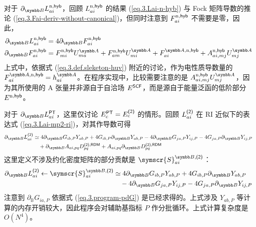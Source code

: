 对于 $\partial_\mathbb{B} L_{ai}^{\mathrm{n}, \textmt{hyb}}$，回顾 $L_{ai}^{\mathrm{n}, \textsf{hyb}}$ 的结果 (\ref{eq.3.Lai-n-hyb}) 与 Fock 矩阵导数的推论 (\ref{eq.3.Fai-deriv-without-canonical})，但同时注意到 $F_{ai}^{\mathrm{n}, \textsf{hyb}}$ 不需要是零，因此，
\begin{align}
    \partial_\mathbb{B} L_{ai}^{\mathrm{n}, \textmt{hyb}} &= 4 \partial_\mathbb{B} F_{ai}^{\mathrm{n}, \textmt{hyb}} \\
    \partial_\mathbb{B} F_{ai}^{\mathrm{n}, \textmt{hyb}} &= F_{mi}^{\mathrm{n}, \textmt{hyb}} U_{ma}^\mathbb{A} + F_{am}^{\mathrm{n}, \textmt{hyb}} U_{mi}^\mathbb{A} + F_{ai}^{\mathbb{A}, \mathrm{n}, \textmt{hyb}} + A_{ai, mj}^{\mathrm{n}, \textmt{hyb}} U_{mj}^\mathbb{A}
\end{align}
上式中，依据式 (\ref{eq.3.def.sleketon-huv}) 附近的讨论，作为电性质导数量的 $F_{ai}^{\mathbb{A}, \mathrm{n}, \textmt{hyb}} = h_{ai}^\mathbb{A}$。在程序实现中，比较需要注意的是 $A_{ai, mj}^{\mathrm{n}, \textmt{hyb}} U_{mj}^\mathbb{A}$，因为其所使用的 A 张量并非源自于自洽场 $E^{\textsf{SCF}}$，而是源自于能量泛函的低阶部分 $E^{\mathrm{n}, \textsf{hyb}}$。

对于 $\partial_\mathbb{B} L_{ai}^\textmt{PT}$，这里仅讨论 $E_\mathrm{c}^{\textsf{PT}} = E_\mathrm{c}^{\textsf{(2)}}$ 的情形。回顾 $L_{ai}^{\textsf{(2)}}$ 在 RI 近似下的表达式 (\ref{eq.3.Lai-mp2-ri})，对其作导数可得
\begin{align}
    \partial_\mathbb{B} L_{ai}^\textmt{(2)} &\simeq 4 \partial_\mathbb{B} G_{ib, P} Y_{ab, P} + 4 G_{ib, P} \partial_\mathbb{B} Y_{ab, P} - 4 \partial_\mathbb{B} G_{ja, P} Y_{ij, P} - 4 G_{ja, P} \partial_\mathbb{B} Y_{ij, P} \notag\\
    &\quad + \partial_\mathbb{B} A_{ai, pq} D_{pq}^{\textmt{(2)}, \textmt{RDM}} + A_{ai, pq} \partial_\mathbb{B} D_{pq}^{\textmt{(2)}, \textmt{RDM}}
\end{align}
这里定义不涉及约化密度矩阵的部分贡献是 $\symscr{S}_{ai}^{\mathbb{B}, \textmt{(2)}}$：
\begin{align}
    \label{eq.3.def.SCR3}
    \partial_\mathbb{B} L_{ai}^\textmt{(2)} \leftarrow \symscr{S}_{ai}^{\mathbb{B}, \textmt{(2)}} &\simeq 4 \partial_\mathbb{B} G_{ib, P} Y_{ab, P} + 4 G_{ib, P} \partial_\mathbb{B} Y_{ab, P} \notag\\
    &\quad - 4 \partial_\mathbb{B} G_{ja, P} Y_{ij, P} - 4 G_{ja, P} \partial_\mathbb{B} Y_{ij, P}
\end{align}
注意到 $\partial_\mathbb{B} G_{ia, P}$ 依据式 (\ref{eq.3.program-pdG}) 是已经求得的。上式涉及 $Y_{ab, P}$ 等计算的内存开销较大，因此程序会对辅助基指标 $P$ 作分批循环。上式计算复杂度是 $O(N^4)$。

